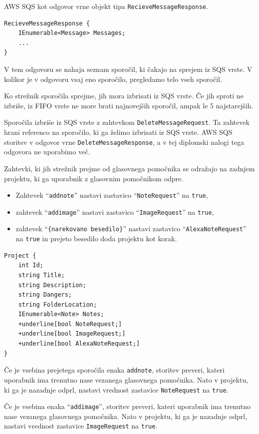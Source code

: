 \documentclass[a4paper, 12pt]{book}
\begin{document}
AWS SQS kot odgovor vrne objekt tipa \texttt{RecieveMessageResponse}.

\begin{Verbatim}[commandchars=+\[\]]
RecieveMessageResponse {
    IEnumerable<Message> Messages;
    ...
}
\end{Verbatim}

V tem odgovoru se nahaja seznam sporočil, ki čakajo na sprejem iz SQS vrste.
V kolikor je v odgovoru vsaj eno sporočilo, pregledamo telo vseh sporočil. 

Ko strežnik sporočila sprejme, jih mora izbrisati iz SQS vrste.
Če jih sproti ne izbriše, iz FIFO vrste ne more brati najnovejših sporočil, ampak le 5 najstarejših.

Sporočila izbriše iz SQS vrste z zahtevkom \texttt{DeleteMessageRequest}.
Ta zahtevek hrani referenco na sporočilo, ki ga želimo izbrisati iz SQS vrste.
AWS SQS storitev v odgovor vrne \texttt{DeleteMessageResponse}, a v tej diplomski nalogi tega odgovora ne uporabimo več.

Zahtevki, ki jih strežnik prejme od glasovnega pomočnika se odražajo na zadnjem projektu, ki ga uporabnik z glasovnim pomočnikom odpre.
\begin{itemize}
	\item Zahtevek \enquote{\texttt{addnote}} nastavi zastavico \enquote{\texttt{NoteRequest}} na \texttt{true},
	\item zahtevek \enquote{\texttt{addimage}} nastavi zastavico \enquote{\texttt{ImageRequest}} na \texttt{true},
	\item zahtevek \enquote{\texttt{\{narekovano besedilo\}}} nastavi zastavico \enquote{\texttt{AlexaNoteRequest}} na \texttt{true} in prejeto besedilo doda projektu kot korak.
\end{itemize}

\begin{Verbatim}[commandchars=+\[\]]
Project { 
    int Id; 
    string Title; 
    string Description; 
    string Dangers; 
    string FolderLocation; 
    IEnumerable<Note> Notes; 
    +underline[bool NoteRequest;] 
    +underline[bool ImageRequest;] 
    +underline[bool AlexaNoteRequest;] 
}
\end{Verbatim}


Če je vsebina prejetega sporočila enaka \texttt{addnote}, storitev preveri, kateri uporabnik ima trenutno nase vezanega glasovnega pomočnika.
Nato v projektu, ki ga je nazadnje odprl, nastavi vrednost zastavice \texttt{NoteRequest} na \texttt{true}.


Če je vsebina enaka \enquote{\texttt{addimage}}, storitev preveri, kateri uporabnik ima trenutno nase vezanega glasovnega pomočnika.
Nato v projektu, ki ga je nazadnje odprl, nastavi vrednost zastavice \texttt{ImageRequest} na \texttt{true}.
\end{document}
